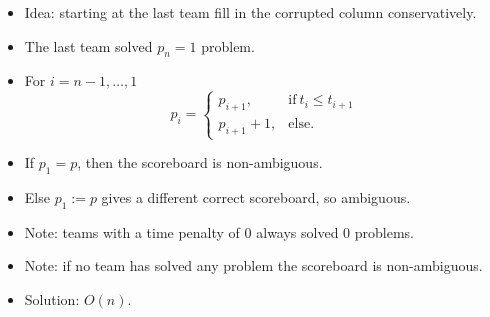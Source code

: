 \begin{frame}
	\frametitle{\problemtitle}
    \begin{itemize}
		\item Idea: starting at the last team fill in the corrupted column conservatively.
		\item The last team solved $p_n=1$ problem.
		\item For $i=n-1, \ldots, 1$
		$$p_i=\begin{cases}
      p_{i+1}, & \text{if}\ t_i \leq t_{i+1} \\
      p_{i+1}+1, & \text{else.}
    \end{cases}$$
    	\item If $p_1 = p$, then the scoreboard is non-ambiguous.
    	\item Else $p_1:=p$ gives a different correct scoreboard, so ambiguous.
    	\item Note: teams with a time penalty of $0$ always solved $0$ problems.
    	\item Note: if no team has solved any problem the scoreboard is non-ambiguous.
    	\item Solution: $O(n)$.
    \end{itemize}
\end{frame}
